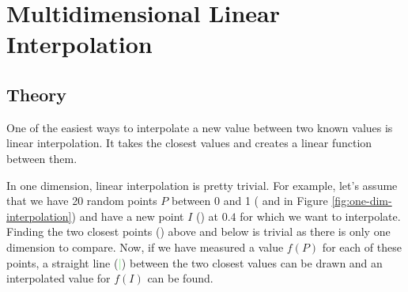 \section{Multidimensional Linear Interpolation}

\subsection{Theory}

One of the easiest ways to interpolate a new value between two known values is linear interpolation. It takes the closest values and creates a linear function between them.

In one dimension, linear interpolation is pretty trivial. For example, let's assume that we have 20 random points $P$ between 0 and 1 (\textcolor{Red}{\textbullet} and  \textcolor{Blue}{\textbullet} in Figure \ref{fig:one-dim-interpolation}) and have a new point $I$ (\textcolor{Green}{\textbullet}) at $0.4$ for which we want to interpolate. Finding the two closest points (\textcolor{Red}{\textbullet}) above and below is trivial as there is only one dimension to compare. Now, if we have measured a value $f(P)$ for each of these points, a straight line (\textcolor{LightGreen}{\textbf{|}}) between the two closest values can be drawn and an interpolated value for $f(I)$ can be found. 

